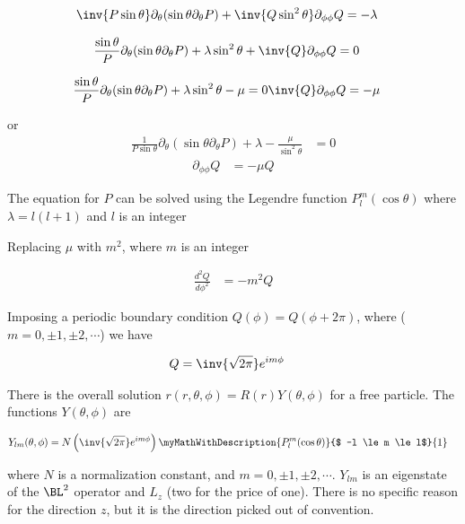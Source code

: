 \begin{align*}
\inv{P \sin\theta} \partial_\theta (\sin\theta \partial_\theta P) + \inv{Q \sin^2\theta} \partial_{\phi\phi} Q &= -\lambda
\end{align*}

\begin{align*}
\frac{\sin\theta}{P } \partial_\theta (\sin\theta \partial_\theta P)
+\lambda  \sin^2\theta
+ \inv{Q } \partial_{\phi\phi} Q &= 0
\end{align*}

\begin{align*}
\frac{\sin\theta}{P } \partial_\theta (\sin\theta \partial_\theta P) + \lambda \sin^2\theta - \mu = 0
\inv{Q } \partial_{\phi\phi} Q &= -\mu
\end{align*}

or
\begin{align}\label{eqn:PHY356F:1000}
\frac{1}{P \sin\theta} \partial_\theta (\sin\theta \partial_\theta P) +\lambda -\frac{\mu}{\sin^2\theta} &= 0
\end{align}
\begin{align}\label{eqn:PHY356F:2000}
\partial_{\phi\phi} Q &= -\mu Q
\end{align}

The equation for $P$ can be solved using the Legendre function $P_l^m(\cos\theta)$ where $\lambda = l(l+1)$ and $l$ is an integer

Replacing $\mu$ with $m^2$, where $m$ is an integer

\begin{align*}
\frac{d^2 Q}{d\phi^2} &= -m^2 Q
\end{align*}

Imposing a periodic boundary condition $Q(\phi) = Q(\phi + 2\pi)$, where ($m = 0, \pm 1, \pm 2, \cdots$) we have

\begin{align*}
Q &= \inv{\sqrt{2\pi}} e^{im\phi}
\end{align*}

There is the overall solution $r(r,\theta,\phi) = R(r) Y(\theta, \phi)$ for a free particle.  The functions $Y(\theta, \phi)$ are

\begin{align*}
Y_{lm}(\theta, \phi)
&= N \left( \inv{\sqrt{2\pi}} e^{im\phi} \right) \myMathWithDescription{ P_l^m(\cos\theta) }{$ -l \le m \le l$}{1}
\end{align*}

where $N$ is a normalization constant, and $m = 0, \pm 1, \pm 2, \cdots$.  $Y_{lm}$ is an eigenstate of the $\BL^2$ operator and $L_z$ (two for the price of one).  There is no specific reason for the direction $z$, but it is the direction picked out of convention.

